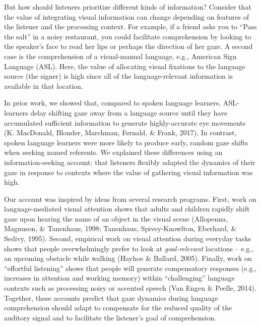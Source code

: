 \documentclass[10pt, letterpaper]{article}
\begin{document}
But how should listeners prioritize different kinds of information?
Consider that the value of integrating visual information can change
depending on features of the listener and the processing context. For
example, if a friend asks you to ``Pass the salt'' in a noisy
restaurant, you could facilitate comprehension by looking to the
speaker's face to read her lips or perhaps the direction of her gaze. A
second case is the comprehension of a visual-manual language, e.g.,
American Sign Language (ASL). Here, the value of allocating visual
fixations to the language source (the signer) is high since all of the
language-relevant information is available in that location.

In prior work, we showed that, compared to spoken language learners,
ASL-learners delay shifting gaze away from a language source until they
have accumulated sufficient information to generate highly-accurate eye
movements (K. MacDonald, Blonder, Marchman, Fernald, \& Frank, 2017). In
contrast, spoken language learners were more likely to produce early,
random gaze shifts when seeking named referents. We explained these
differences using an information-seeking account: that listeners
flexibly adapted the dynamics of their gaze in response to contexts
where the value of gathering visual information was high.

Our account was inspired by ideas from several research programs. First,
work on language-mediated visual attention shows that adults and
children rapidly shift gaze upon hearing the name of an object in the
visual scene (Allopenna, Magnuson, \& Tanenhaus, 1998; Tanenhaus,
Spivey-Knowlton, Eberhard, \& Sedivy, 1995). Second, empirical work on
visual attention during everyday tasks shows that people overwhelmingly
prefer to look at \emph{goal-relevant} locations -- e.g., an upcoming
obstacle while walking (Hayhoe \& Ballard, 2005). Finally, work on
``effortful listening'' shows that people will generate compensatory
responses (e.g., increases in attention and working memory) within
``challenging'' language contexts such as processing noisy or accented
speech (Van Engen \& Peelle, 2014). Together, these accounts predict
that gaze dynamics during language comprehension should adapt to
compensate for the reduced quality of the auditory signal and to
facilitate the listener's goal of comprehension.
\end{document}
